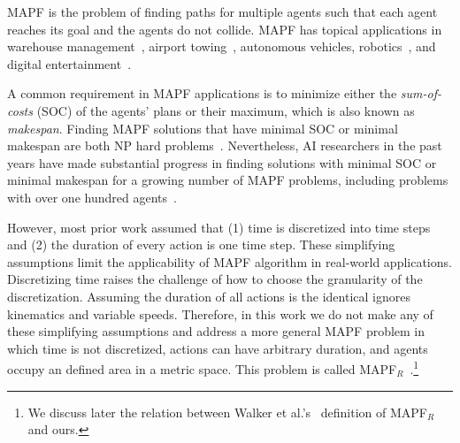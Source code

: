 \documentclass[review]{elsarticle}
\newcommand\konstantin[1]{\nb{\textbf{Konstantin:}}{red}{#1}}
\newcommand\roni[1]{\nb{\textbf{Roni:}}{green}{#1}}
\newcommand{\mapfr}{\ac{MAPF}$_R$\xspace}
\newcommand{\mapf}{\ac{MAPF}\xspace}
\begin{document}

\mapf is the problem of finding paths for multiple agents such that each agent reaches its goal and the agents do not collide. \mapf has topical applications in warehouse management~\cite{wurman2008coordinating}, airport towing~\cite{morris2016planning}, autonomous vehicles, robotics~\cite{veloso2015cobots}, and digital entertainment~\cite{ma2017feasibility}.


A common requirement in \mapf applications is to minimize either the \emph{sum-of-costs} (SOC) of the agents' plans 
or their maximum, which is also known as \emph{makespan}. %
Finding \mapf solutions that have minimal SOC or minimal makespan are both NP hard problems~\cite{surynek2010optimization,yu2013structure}.  
Nevertheless, AI researchers in the past years have made substantial progress in finding solutions with minimal SOC or minimal makespan for a growing number of \mapf problems, including problems with over one hundred agents~\cite{sharon2015conflict,sharon2013increasing,wagner2015subdimensional,standley2010finding,felner2018adding,ICTAIpicat,yu2013structure}. 


However, most prior work assumed that 
(1) time is discretized into time steps and
(2) the duration of every action is one time step. 
These simplifying assumptions limit the applicability of \mapf algorithm in real-world applications. Discretizing time raises the challenge of how to choose the granularity of the discretization. Assuming the duration of all actions is the identical ignores kinematics and variable speeds. 
Therefore, in this work we do not make any of these simplifying assumptions and address a more general \mapf problem in which time is not discretized, actions can have arbitrary duration, and agents occupy an defined area in a metric space. This problem is called \mapfr~\cite{walker2018extended}.\footnote{We discuss later the relation between Walker et al.'s~\cite{walker2018extended} definition of \mapfr and ours.}
\end{document}
